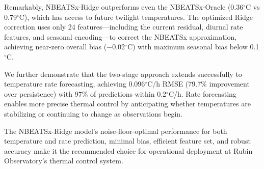 \documentclass[11pt]{article}
\begin{document}
Remarkably, NBEATSx-Ridge outperforms even the NBEATSx-Oracle (0.36$^\circ$C vs 0.79$^\circ$C), which has access to future twilight temperatures. The optimized Ridge correction uses only 24 features---including the current residual, diurnal rate features, and seasonal encoding---to correct the NBEATSx approximation, achieving near-zero overall bias ($-$0.02$^\circ$C) with maximum seasonal bias below 0.1$^\circ$C.

We further demonstrate that the two-stage approach extends successfully to temperature rate forecasting, achieving 0.096$^\circ$C/h RMSE (79.7\% improvement over persistence) with 97\% of predictions within 0.2$^\circ$C/h. Rate forecasting enables more precise thermal control by anticipating whether temperatures are stabilizing or continuing to change as observations begin.

The NBEATSx-Ridge model's noise-floor-optimal performance for both temperature and rate prediction, minimal bias, efficient feature set, and robust accuracy make it the recommended choice for operational deployment at Rubin Observatory's thermal control system.
\end{document}

